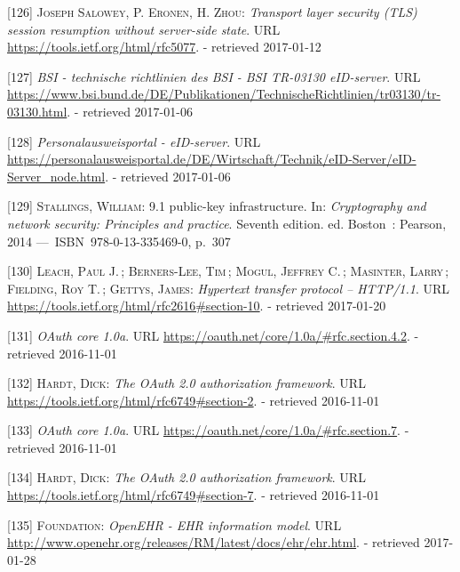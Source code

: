 \documentclass[12pt,english,a4paper,titlepage,cleardoublepage=empty,dottedtoc]{report}
\begin{document}
\hypertarget{ref-web_spec_tls-session-ticket-resumption}{}
{[}126{]} \textsc{Joseph Salowey, P. Eronen, \textnormal{H. Zhou}}:
\emph{Transport layer security (TLS) session resumption without
server-side state}. URL \url{https://tools.ietf.org/html/rfc5077}. -
retrieved 2017-01-12

\hypertarget{ref-web_bsi-spec_eid}{}
{[}127{]} \emph{BSI - technische richtlinien des BSI - BSI TR-03130
eID-server}. URL
\url{https://www.bsi.bund.de/DE/Publikationen/TechnischeRichtlinien/tr03130/tr-03130.html}.
- retrieved 2017-01-06

\hypertarget{ref-web_2017_npa-eid-server}{}
{[}128{]} \emph{Personalausweisportal - eID-server}. URL
\url{https://personalausweisportal.de/DE/Wirtschaft/Technik/eID-Server/eID-Server_node.html}.
- retrieved 2017-01-06

\hypertarget{ref-book_2014_chapter-10-5-asym-random-number-gen}{}
{[}129{]} \textsc{Stallings, William}: 9.1 public-key infrastructure.
In: \emph{Cryptography and network security: Principles and practice}.
Seventh edition. ed. Boston~: Pearson, 2014 ---~ISBN~978-0-13-335469-0,
p.~307

\hypertarget{ref-web_spec_http-error-codes}{}
{[}130{]} \textsc{Leach, Paul J.}\,; \textsc{Berners-Lee, Tim}\,;
\textsc{Mogul, Jeffrey C.}\,; \textsc{Masinter, Larry}\,;
\textsc{Fielding, Roy T.}\,; \textsc{Gettys, James}: \emph{Hypertext
transfer protocol -- HTTP/1.1}. URL
\url{https://tools.ietf.org/html/rfc2616\#section-10}. - retrieved
2017-01-20

\hypertarget{ref-web_spec_oauth-1a_client-reg}{}
{[}131{]} \emph{OAuth core 1.0a}. URL
\url{https://oauth.net/core/1.0a/\#rfc.section.4.2}. - retrieved
2016-11-01

\hypertarget{ref-web_spec_oauth-2_client-reg}{}
{[}132{]} \textsc{Hardt, Dick}: \emph{The OAuth 2.0 authorization
framework}. URL \url{https://tools.ietf.org/html/rfc6749\#section-2}. -
retrieved 2016-11-01

\hypertarget{ref-web_spec_oauth-1a_access-verification}{}
{[}133{]} \emph{OAuth core 1.0a}. URL
\url{https://oauth.net/core/1.0a/\#rfc.section.7}. - retrieved
2016-11-01

\hypertarget{ref-web_spec_oauth-2_access-verification}{}
{[}134{]} \textsc{Hardt, Dick}: \emph{The OAuth 2.0 authorization
framework}. URL \url{https://tools.ietf.org/html/rfc6749\#section-7}. -
retrieved 2016-11-01

\hypertarget{ref-web_spec_data-schemas_ehr}{}
{[}135{]} \textsc{Foundation}: \emph{OpenEHR - EHR information model}.
URL \url{http://www.openehr.org/releases/RM/latest/docs/ehr/ehr.html}. -
retrieved 2017-01-28
\end{document}

